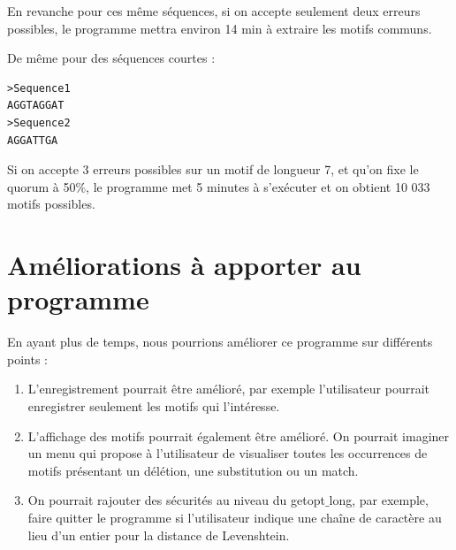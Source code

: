 \documentclass[a4paper,12pt]{article}
\begin{document}
En revanche pour ces même séquences, si on accepte seulement deux erreurs possibles, le programme mettra environ 14 min à extraire les motifs communs. 

De même pour des séquences courtes : 

\begin{lstlisting}
>Sequence1
AGGTAGGAT
>Sequence2
AGGATTGA
\end{lstlisting}

Si on accepte 3 erreurs possibles sur un motif de longueur 7, et qu'on fixe le quorum à 50\%, le programme met 5 minutes à s'exécuter et on obtient 10 033 motifs possibles. 



\section{Améliorations à apporter au programme}

En ayant plus de temps, nous pourrions améliorer ce programme sur différents points : 
\begin{enumerate}
\setlength{\itemsep}{1pt}
\setlength{\parskip}{0pt}
\setlength{\parsep}{0pt}
\item L'enregistrement pourrait être amélioré, par exemple l'utilisateur pourrait enregistrer seulement les motifs qui l’intéresse. 

\item L'affichage des motifs pourrait également être amélioré. On pourrait imaginer un menu qui propose à l'utilisateur de visualiser toutes les occurrences de motifs présentant un délétion, une substitution ou un match. 

\item On pourrait rajouter des sécurités au niveau du getopt$\_$long, par exemple, faire quitter le programme si l'utilisateur indique une chaîne de caractère au lieu d'un entier pour la distance de Levenshtein. 

\end{enumerate}
\end{document}
